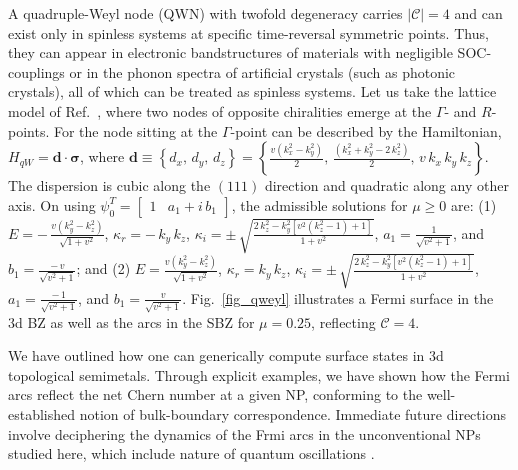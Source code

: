 \documentclass[aps,prl,twocolumn,nofootinbib,showkeys, nolongbibliography, 10pt]{revtex4-2}
\begin{document}
A quadruple-Weyl node (QWN) with twofold degeneracy carries $ |\mathcal C| =4 $ \cite{charge4-1, charge4-2, charge4-3, charge4-4} and can exist only in spinless systems at specific time-reversal symmetric points. Thus, they can appear in electronic bandstructures of materials with
negligible SOC-couplings or in the phonon spectra of artificial crystals (such as photonic crystals), all of which can be treated as spinless systems. Let us take the lattice model of Ref.~\cite{charge4-4}, where two nodes of opposite chiralities emerge at the $\Gamma$- and $R$-points. 
For the node sitting at the $\Gamma$-point can be described by the Hamiltonian,
$H_{qW} = \boldsymbol{d} \cdot \boldsymbol{\sigma}$, where
$\boldsymbol{d} \equiv \left\{ d_x,\, d_y, \, d_z \right\}= \left\{\frac{ v \left(k_x^2-k_y^2\right)}{2}, \,\frac{\left(k_x^2+k_y^2-2 \,k_z^2\right)}{2} ,
\,v\, k_x\, k_y\, k_z\right\}$.
The dispersion is cubic along the $(111)$ direction and quadratic along any other axis. On using $ \psi_0^T  = \begin{bmatrix}
1 & a_1 +i \, b_1 \end{bmatrix}$, the admissible solutions for $\mu \geq 0 $ are: (1) $E = -\, \frac{v \left(k_y^2-k_z^2\right)}
{\sqrt{ 1 + v^2 }}$, $\kappa_r = -\,k_y\, k_z$, $\kappa_i = \pm \, 
\sqrt{\frac{ 2 \,k_z^2 - k_y^2 \left[ v^2 \left(k_z^2-1\right) +1\right ]}
{ 1 + v^2}}$, $a_1= \frac{1}{\sqrt{v^2+1}}$, and $b_1  = \frac{-\, v}{\sqrt{v^2+1}}$; and
(2) $E =  \frac{v \left(k_y^2-k_z^2\right)}{\sqrt{ 1 + v^2 }}$,
$\kappa_r = k_y\, k_z$, $\kappa_i = \pm \, 
\sqrt{\frac{ 2 \,k_z^2 - k_y^2 \left[ v^2 \left(k_z^2-1\right) +1\right ]}
{ 1 + v^2}}$, $a_1= \frac{ -\,1}{\sqrt{v^2+1}}$, and $b_1  = \frac{v}{\sqrt{v^2+1}}$.
Fig.~\ref{fig_qweyl} illustrates a Fermi surface in the 3d BZ as well as the arcs in the SBZ for $\mu=0.25$, reflecting $\mathcal C = 4$.


We have outlined how one can generically compute surface states in 3d topological semimetals. Through explicit examples, we have shown how the Fermi arcs reflect the net Chern number at a given NP, conforming to the well-established notion of bulk-boundary correspondence. Immediate future directions involve deciphering the dynamics of the Frmi arcs in the unconventional NPs studied here, which include nature of quantum oscillations \cite{qtm-osc-ashvin, hosur-arc-osc}.


 


\end{document}
